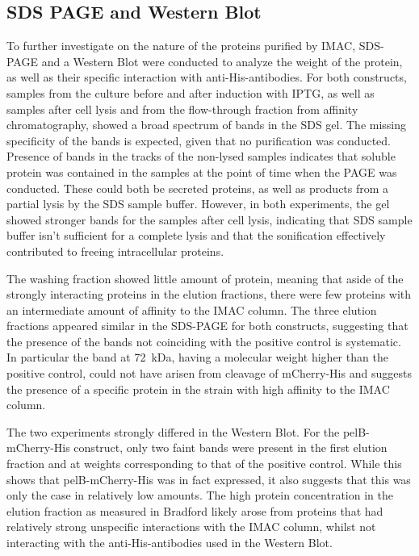 \documentclass[a4paper,12pt]{article}
\begin{document}
\subsection{SDS PAGE and Western Blot}
To further investigate on the nature of the proteins purified by IMAC, SDS-PAGE and a Western Blot were conducted to analyze the weight of the protein, as well as their specific interaction with anti-His-antibodies. For both constructs, samples from the culture before and after induction with IPTG, as well as samples after cell lysis and from the flow-through fraction from affinity chromatography, showed a broad spectrum of bands in the SDS gel. The missing specificity of the bands is expected, given that no purification was conducted. Presence of bands in the tracks of the non-lysed samples indicates that soluble protein was contained in the samples at the point of time when the PAGE was conducted. These could both be secreted proteins, as well as products from a partial lysis by the SDS sample buffer. However, in both experiments, the gel showed stronger bands for the samples after cell lysis, indicating that SDS sample buffer isn't sufficient for a complete lysis and that the sonification effectively contributed to freeing intracellular proteins. 

The washing fraction showed little amount of protein, meaning that aside of the strongly interacting proteins in the elution fractions, there were few proteins with an intermediate amount of affinity to the IMAC column. The three elution fractions appeared similar in the SDS-PAGE for both constructs, suggesting that the presence of the bands not coinciding with the positive control is systematic. In particular the band at 72~kDa, having a molecular weight higher than the positive control, could not have arisen from cleavage of mCherry-His and suggests the presence of a specific protein in the strain with high affinity to the IMAC column.

The two experiments strongly differed in the Western Blot. For the pelB-mCherry-His construct, only two faint bands were present in the first elution fraction and at weights corresponding to that of the positive control. While this shows that pelB-mCherry-His was in fact expressed, it also suggests that this was only the case in relatively low amounts. The high protein concentration in the elution fraction as measured in Bradford likely arose from proteins that had relatively strong unspecific interactions with the IMAC column, whilst not interacting with the anti-His-antibodies used in the Western Blot. 
\end{document}
